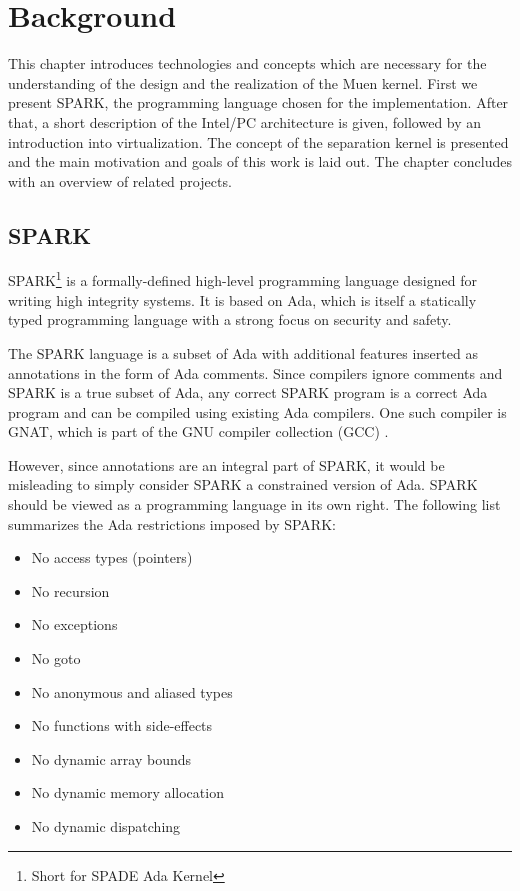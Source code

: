 \chapter{Background}
This chapter introduces technologies and concepts which are necessary for the
understanding of the design and the realization of the Muen kernel.  First we
present SPARK, the programming language chosen for the implementation.  After
that, a short description of the Intel/PC architecture is given, followed by an
introduction into virtualization. The concept of the separation kernel is
presented and the main motivation and goals of this work is laid out. The
chapter concludes with an overview of related projects.

\section{SPARK}\label{sec:spark}
SPARK\footnote{Short for SPADE Ada Kernel} is a formally-defined high-level
programming language designed for writing high integrity systems. It is based on
Ada, which is itself a statically typed programming language with a strong focus
on security and safety.

The SPARK language is a subset of Ada with additional features inserted as
annotations in the form of Ada comments. Since compilers ignore comments and
SPARK is a true subset of Ada, any correct SPARK program is a correct Ada
program and can be compiled using existing Ada compilers. One such compiler is
GNAT, which is part of the GNU compiler collection (GCC) \cite{gcc}.

However, since annotations are an integral part of SPARK, it would be misleading
to simply consider SPARK a constrained version of Ada. SPARK should be viewed as
a programming language in its own right. The following list summarizes the Ada
restrictions imposed by SPARK:

\begin{itemize}
	\item No access types (pointers)
	\item No recursion
	\item No exceptions
	\item No goto
	\item No anonymous and aliased types
	\item No functions with side-effects
	\item No dynamic array bounds
	\item No dynamic memory allocation
	\item No dynamic dispatching
\end{itemize}

